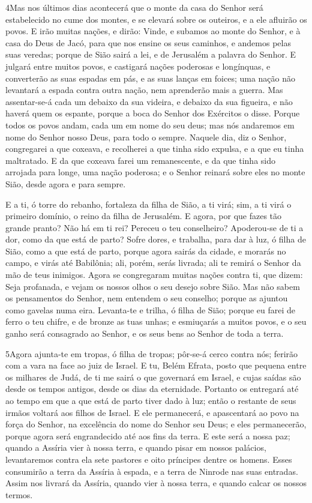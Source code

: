 \medskip

\lettrine{4} Mas nos últimos dias acontecerá que o monte da
casa do Senhor será estabelecido no cume dos montes, e se elevará
sobre os outeiros, e a ele afluirão os povos. E irão muitas
nações, e dirão: Vinde, e subamos ao monte do Senhor, e à casa do
Deus de Jacó, para que nos ensine os seus caminhos, e andemos pelas
suas veredas; porque de Sião sairá a lei, e de Jerusalém a palavra
do Senhor. E julgará entre muitos povos, e castigará nações
poderosas e longínquas, e converterão as suas espadas em pás, e as
suas lanças em foices; uma nação não levantará a espada contra outra
nação, nem aprenderão mais a guerra. Mas assentar-se-á cada um
debaixo da sua videira, e debaixo da sua figueira, e não haverá quem
os espante, porque a boca do Senhor dos Exércitos o disse.
Porque todos os povos andam, cada um em nome do seu deus; mas
nós andaremos em nome do Senhor nosso Deus, para todo o sempre.
Naquele dia, diz o Senhor, congregarei a que coxeava, e
recolherei a que tinha sido expulsa, e a que eu tinha maltratado.
E da que coxeava farei um remanescente, e da que tinha sido
arrojada para longe, uma nação poderosa; e o Senhor reinará sobre
eles no monte Sião, desde agora e para sempre.

E a ti, ó torre do rebanho, fortaleza da filha de Sião, a ti virá;
sim, a ti virá o primeiro domínio, o reino da filha de Jerusalém.
E agora, por que fazes tão grande pranto? Não há em ti rei?
Pereceu o teu conselheiro? Apoderou-se de ti a dor, como da que está
de parto? Sofre dores, e trabalha, para dar à luz, ó filha de
Sião, como a que está de parto, porque agora sairás da cidade, e
morarás no campo, e virás até Babilônia; ali, porém, serás livrada;
ali te remirá o Senhor da mão de teus inimigos. Agora se
congregaram muitas nações contra ti, que dizem: Seja profanada, e
vejam os nossos olhos o seu desejo sobre Sião. Mas não sabem
os pensamentos do Senhor, nem entendem o seu conselho; porque as
ajuntou como gavelas numa eira. Levanta-te e trilha, ó filha
de Sião; porque eu farei de ferro o teu chifre, e de bronze as tuas
unhas; e esmiuçarás a muitos povos, e o seu ganho será consagrado ao
Senhor, e os seus bens ao Senhor de toda a terra.

\medskip

\lettrine{5} Agora ajunta-te em tropas, ó filha de tropas;
pôr-se-á cerco contra nós; ferirão com a vara na face ao juiz de
Israel. E tu, Belém Efrata, posto que pequena entre os milhares
de Judá, de ti me sairá o que governará em Israel, e cujas saídas
são desde os tempos antigos, desde os dias da eternidade.
Portanto os entregará até ao tempo em que a que está de parto
tiver dado à luz; então o restante de seus irmãos voltará aos filhos
de Israel. E ele permanecerá, e apascentará ao povo na força do
Senhor, na excelência do nome do Senhor seu Deus; e eles
permanecerão, porque agora será engrandecido até aos fins da terra.
E este será a nossa paz; quando a Assíria vier à nossa terra, e
quando pisar em nossos palácios, levantaremos contra ela sete
pastores e oito príncipes dentre os homens. Esses consumirão a
terra da Assíria à espada, e a terra de Ninrode nas suas entradas.
Assim nos livrará da Assíria, quando vier à nossa terra, e quando
calcar os nossos termos.

